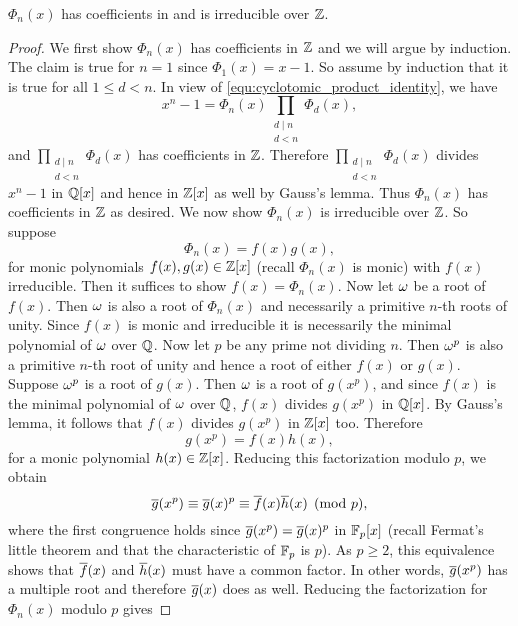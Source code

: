     \begin{proposition}\label{prop:cyclotomic_is_irreducible}
      $\Phi_{n}(x)$ has coefficients in and is irreducible over $\mathbb{Z}$.
    \end{proposition}
    \begin{proof}
      We first show $\Phi_{n}(x)$ has coefficients in $\mathbb{Z}$ and we will argue by induction. The claim is true for $n = 1$ since $\Phi_{1}(x) = x-1$. So assume by induction that it is true for all $1 \le d < n$. In view of \cref{equ:cyclotomic_product_identity}, we have
      \[
        x^{n}-1 = \Phi_{n}(x)\prod_{\substack{d \mid n \\ d < n}}\Phi_{d}(x),
      \]
      and $\prod_{\substack{d \mid n \\ d < n}}\Phi_{d}(x)$ has coefficients in $\mathbb{Z}$. Therefore $\prod_{\substack{d \mid n \\ d < n}}\Phi_{d}(x)$ divides $x^{n}-1$ in $\mathbb{Q}[x]$ and hence in $\mathbb{Z}[x]$ as well by Gauss's lemma. Thus $\Phi_{n}(x)$ has coefficients in $\mathbb{Z}$ as desired. We now show $\Phi_{n}(x)$ is irreducible over $\mathbb{Z}$. So suppose
      \[
        \Phi_{n}(x) = f(x)g(x),
      \]
      for monic polynomials $f(x),g(x) \in \mathbb{Z}[x]$ (recall $\Phi_{n}(x)$ is monic) with $f(x)$ irreducible. Then it suffices to show $f(x) = \Phi_{n}(x)$. Now let $\omega$ be a root of $f(x)$. Then $\omega$ is also a root of $\Phi_{n}(x)$ and necessarily a primitive $n$-th roots of unity. Since $f(x)$ is monic and irreducible it is necessarily the minimal polynomial of $\omega$ over $\mathbb{Q}$. Now let $p$ be any prime not dividing $n$. Then $\omega^{p}$ is also a primitive $n$-th root of unity and hence a root of either $f(x)$ or $g(x)$. Suppose $\omega^{p}$ is a root of $g(x)$. Then $\omega$ is a root of $g(x^{p})$, and since $f(x)$ is the minimal polynomial of $\omega$ over $\mathbb{Q}$, $f(x)$ divides $g(x^{p})$ in $\mathbb{Q}[x]$. By Gauss's lemma, it follows that $f(x)$ divides $g(x^{p})$ in $\mathbb{Z}[x]$ too. Therefore
      \[
        g(x^{p}) = f(x)h(x),
      \]
      for a monic polynomial $h(x) \in \mathbb{Z}[x]$. Reducing this factorization modulo $p$, we obtain
      \[
        \overline{g}(x^{p}) \equiv \overline{g}(x)^{p} \equiv \overline{f}(x)\overline{h}(x) \pmod{p},
      \]
      where the first congruence holds since $\overline{g}(x^{p}) = \overline{g}(x)^{p}$ in $\mathbb{F}_{p}[x]$ (recall Fermat's little theorem and that the characteristic of $\mathbb{F}_{p}$ is $p$). As $p \ge 2$, this equivalence shows that $\overline{f}(x)$ and $\overline{h}(x)$ must have a common factor. In other words, $\overline{g}(x^{p})$ has a multiple root and therefore $\overline{g}(x)$ does as well. Reducing the factorization for $\Phi_{n}(x)$ modulo $p$ gives

\end{proof}
